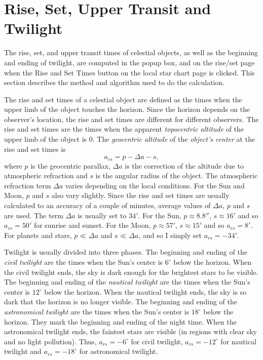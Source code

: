 \documentclass[12pt]{article}
\newcommand \beq {\begin{equation}}
\newcommand \eeq {\end{equation}}
\begin{document}
\section{Rise, Set, Upper Transit and Twilight}

The rise, set, and upper transit times of celestial objects, as well as the beginning and 
ending of twilight, are computed in the popup box, and on the rise/set page when  
the Rise and Set Times button on the local star chart page is clicked. This section describes 
the method and algorithm used to do the calculation.

The rise and set times of a celestial object are defined as the times 
when the upper limb of the object touches the horizon.
Since the horizon depends on the observer's 
location, the rise and set times are different for different observers. 
The rise and set times are the times when the apparent {\em topocentric 
altitude} of the upper limb of the object is 0. 
The {\em geocentric altitude} of the {\em object's center} at the rise and set 
times is 
\beq
  a_{rs} = p - \Delta a - s , 
\eeq
where $p$ is the geocentric parallax, $\Delta a$ is the correction of the 
altitude due to atmospheric refraction and $s$ is the angular radius of the 
object. The atmospheric refraction term $\Delta a$ varies depending on the 
local conditions. For the Sun and Moon, $p$ and $s$ also vary slightly. Since 
the rise and set times are usually calculated to an accuracy of a couple of minutes, 
average values of $\Delta a$, $p$ and $s$ are used. The term $\Delta a$ is usually set 
to $34'$. For the Sun, $p \approx 8.8''$, $s\approx 16'$ and so $a_{rs}=50'$ for 
sunrise and sunset. For the Moon, $p\approx 57'$, $s\approx 15'$ and so $a_{rs}=8'$. 
For planets and stars, $p \ll \Delta a$ and $s \ll \Delta a$, and so I simply 
set $a_{rs}=-34'$. 

Twilight is usually divided into three phases. The beginning and ending 
of the {\em civil twilight} are the times when the Sun's center is $6^\circ$ below 
the horizon. When the civil twilight ends, the sky is dark enough for the 
brightest stars to be visible. The beginning and ending of the {\em nautical 
twilight} are the times when the Sun's center is $12^\circ$ below the horizon. When the 
nautical twilight ends, the sky is so dark that the horizon is no longer visible. 
The beginning and ending of the {\em astronomical twilight} are the times when 
the Sun's center is $18^\circ$ below the horizon. They mark the beginning and ending 
of the night time. When the astronomical twilight ends, the faintest stars 
are visible (in regions with clear sky and no light pollution). Thus, $a_{rs}=-6^\circ$ 
for civil twilight, $a_{rs}=-12^\circ$ for nautical twilight and 
$a_{rs}=-18^\circ$ for astronomical twilight.
\end{document}
